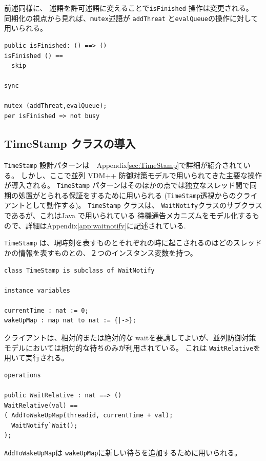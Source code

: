 \documentclass[\pformat,12pt]{jreport}
\begin{document}
前述同様に、 述語を許可述語に変えることで\texttt{isFinished} 操作は変更される。
同期化の視点から見れば、\texttt{mutex}述語が \texttt{addThreat} と\texttt{evalQueue}の操作に対して用いられる。

\begin{lstlisting}
public isFinished: () ==> ()
isFinished () == 
  skip

sync

mutex (addThreat,evalQueue);
per isFinished => not busy
\end{lstlisting}

\subsection{TimeStamp クラスの導入}

 \texttt{TimeStamp} 設計パターンは　Appendix\ref{sec:TimeStamp}で詳細が紹介されている。 
しかし、ここで並列  VDM++ 防御対策モデルで用いられてきた主要な操作が導入される。
 \texttt{TimeStamp} パターンはそのほかの点では独立なスレッド間で同期の処置がとられる保証をするために用いられる (\texttt{TimeStamp}透視からのクライアントとして動作する)。 
 \texttt{TimeStamp} クラスは、  \texttt{WaitNotify}クラスのサブクラスであるが、これはJava \cite{Gosling&00} で用いられている 待機通告メカニズムをモデル化するもので、詳細はAppendix\ref{app:waitnotify}に記述されている.

\texttt{TimeStamp} は、現時刻を表すものとそれぞれの時に起こされるのはどのスレッドかの情報を表すものとの、２つのインスタンス変数を持つ。

\begin{lstlisting}
class TimeStamp is subclass of WaitNotify

instance variables
  
currentTime : nat := 0;
wakeUpMap : map nat to nat := {|->};
\end{lstlisting}

クライアントは、相対的または絶対的な waitを要請してよいが、並列防御対策モデルにおいては相対的な待ちのみが利用されている。
これは \texttt{WaitRelative}を用いて実行される。

\begin{lstlisting}
operations

public WaitRelative : nat ==> ()
WaitRelative(val) ==
( AddToWakeUpMap(threadid, currentTime + val);
  WaitNotify`Wait();
);
\end{lstlisting}

\texttt{AddToWakeUpMap}は \texttt{wakeUpMap}に新しい待ちを追加するために用いられる。
\end{document}
